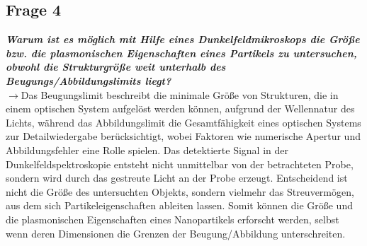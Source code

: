 \subsection{\label{subsec:FZV4}Frage 4}
\textbf{\textit{Warum ist es möglich mit Hilfe eines Dunkelfeldmikroskops die Größe bzw. die
plasmonischen Eigenschaften eines Partikels zu untersuchen, obwohl die Strukturgröße 
weit unterhalb des Beugungs/Abbildungslimits liegt?}} \\
$\rightarrow$Das Beugungslimit beschreibt die minimale Größe von Strukturen, 
die in einem optischen System aufgelöst werden können, aufgrund der Wellennatur des Lichts, 
während das Abbildungslimit die Gesamtfähigkeit eines optischen Systems zur Detailwiedergabe berücksichtigt, 
wobei Faktoren wie numerische Apertur und Abbildungsfehler eine Rolle spielen.
Das detektierte Signal in der Dunkelfeldspektroskopie entsteht nicht unmittelbar von der betrachteten Probe, 
sondern wird durch das gestreute Licht an der Probe erzeugt. 
Entscheidend ist nicht die Größe des untersuchten Objekts, sondern vielmehr das Streuvermögen,
aus dem sich Partikeleigenschaften ableiten lassen. 
Somit können die Größe und die plasmonischen Eigenschaften eines Nanopartikels erforscht werden, 
selbst wenn deren Dimensionen die Grenzen der Beugung/Abbildung unterschreiten.